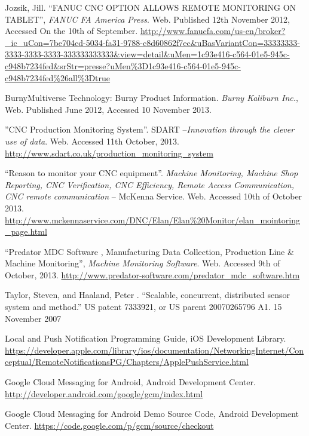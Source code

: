 \documentclass[12pt,letterpaper,titlepage]{article}
\begin{document}
\newpage
\begin{thebibliography}{30}

 Jozsik, Jill. “FANUC CNC OPTION ALLOWS REMOTE MONITORING ON TABLET”, \emph{FANUC FA America Press}. Web.  Published 12th November 2012, Accessed On the 10th of September. \url{http://www.fanucfa.com/us-en/broker?_ic_uCon=7be704cd-5034-fa31-9788-c8d60862f7ec&uBasVariantCon=33333333-3333-3333-3333-333333333333&view=detail&uMen=1c93e416-c564-01e5-945c-c948b7234fed&srStr=presse?uMen%3D1c93e416-c564-01e5-945c-c948b7234fed%26all%3Dtrue}

 Burny\textregistered Multiverse Technology: Burny Product Information. \emph{Burny Kaliburn Inc.}, Web. Published June 2012, Accessed 10 November 2013.

 ”CNC Production Monitoring System”. SDART –\emph{Innovation through the clever use of data}. Web. Accessed 11th October, 2013. \url{http://www.sdart.co.uk/production_monitoring_system}

  “Reason to monitor your CNC equipment”. \emph{Machine Monitoring, Machine Shop Reporting, CNC Verification, CNC Efficiency, Remote Access Communication, CNC remote communication} – McKenna Service. Web. Accessed 10th of October 2013.\url{ http://www.mckennaservice.com/DNC/Elan/Elan%20Monitor/elan_mointoring_page.html}

 “Predator MDC Software , Manufacturing Data Collection, Production Line \& Machine Monitoring”,  \emph{Machine Monitoring Software}. Web. Accessed 9th of October, 2013. \url{http://www.predator-software.com/predator_mdc_software.htm}

 Taylor, Steven, and Haaland, Peter . “Scalable, concurrent, distributed sensor system and method.” US patent 7333921, or US parent 20070265796 A1. 15 November 2007

 Local and Push Notification Programming Guide, iOS Development Library. \url{https://developer.apple.com/library/ios/documentation/NetworkingInternet/Conceptual/RemoteNotificationsPG/Chapters/ApplePushService.html}

 Google Cloud Messaging for Android, Android Development Center. \url{http://developer.android.com/google/gcm/index.html}

 Google Cloud Messaging for Android Demo Source Code, Android Development Center.
\url{https://code.google.com/p/gcm/source/checkout}


\end{thebibliography}
\end{document}
